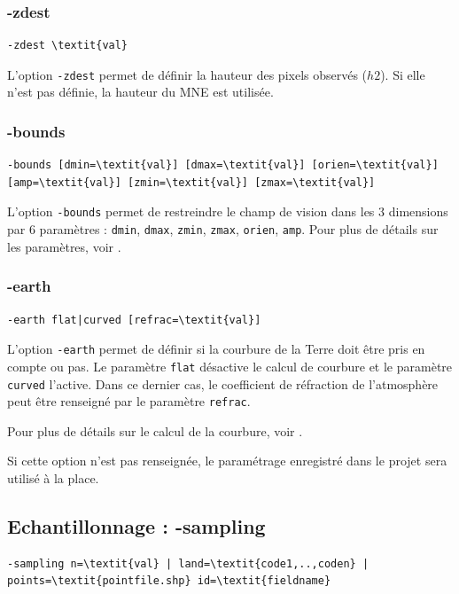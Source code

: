 \documentclass{report}
\begin{document}
\subsubsection{-zdest}
\begin{Verbatim}[commandchars=\\\{\}]
-zdest \textit{val}
\end{Verbatim}
L'option \verb|-zdest| permet de définir la hauteur des pixels observés ($h2$). Si elle n'est pas définie, la hauteur du MNE est utilisée.

\subsubsection{-bounds}
\begin{Verbatim}[commandchars=\\\{\}]
-bounds [dmin=\textit{val}] [dmax=\textit{val}] [orien=\textit{val}] [amp=\textit{val}] [zmin=\textit{val}] [zmax=\textit{val}]
\end{Verbatim}
L'option \verb|-bounds| permet de restreindre le champ de vision dans les 3 dimensions par 6 paramètres : \verb|dmin|, \verb|dmax|, \verb|zmin|, \verb|zmax|, \verb|orien|, \verb|amp|. Pour plus de détails sur les paramètres, voir .

\subsubsection{-earth}
\begin{Verbatim}[commandchars=\\\{\}]
-earth flat|curved [refrac=\textit{val}]
\end{Verbatim}

L'option \verb|-earth| permet de définir si la courbure de la Terre doit être pris en compte ou pas. Le paramètre \verb|flat| désactive le calcul de courbure et le paramètre \verb|curved| l'active. Dans ce dernier cas, le coefficient de réfraction de l'atmosphère peut être renseigné par le paramètre \verb|refrac|.

Pour plus de détails sur le calcul de la courbure, voir .

Si cette option n'est pas renseignée, le paramétrage enregistré dans le projet sera utilisé à la place.

\subsection{Echantillonnage : -sampling}
\begin{Verbatim}[commandchars=\\\{\}]
-sampling n=\textit{val} | land=\textit{code1,..,coden} | points=\textit{pointfile.shp} id=\textit{fieldname}
\end{Verbatim}
\end{document}
